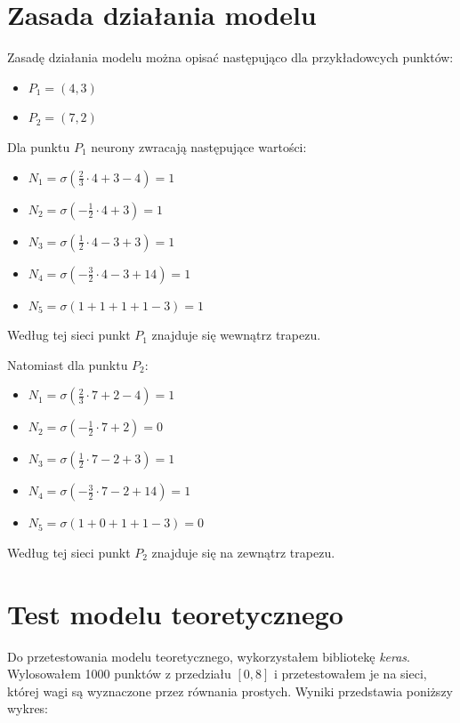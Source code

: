 \documentclass{article}
\begin{document}
\newpage

\section{Zasada działania modelu}

Zasadę działania modelu można opisać następująco dla przykładowcych punktów:

\begin{itemize}
    \centering
    \item $P_1 = (4, 3)$
    \item $P_2 = (7, 2)$
\end{itemize}
Dla punktu $P_1$ neurony zwracają następujące wartości:
\begin{itemize}
    \centering
    \item $N_1 = \sigma(\frac{2}{3}\cdot4 + 3 - 4) = 1$
    \item $N_2 = \sigma(-\frac{1}{2}\cdot4 + 3) = 1$
    \item $N_3 = \sigma(\frac{1}{2}\cdot4 - 3 + 3) = 1$
    \item $N_4 = \sigma(-\frac{3}{2}\cdot4 - 3 + 14) = 1$
    \item $N_5 = \sigma(1 + 1 + 1 + 1 - 3) = 1$
\end{itemize}
Według tej sieci punkt $P_1$ znajduje się wewnątrz trapezu.

Natomiast dla punktu $P_2$:
\begin{itemize}
    \centering
    \item $N_1 = \sigma(\frac{2}{3}\cdot7 + 2 - 4) = 1$
    \item $N_2 = \sigma(-\frac{1}{2}\cdot7 + 2) = 0$
    \item $N_3 = \sigma(\frac{1}{2}\cdot7 - 2 + 3) = 1$
    \item $N_4 = \sigma(-\frac{3}{2}\cdot7 - 2 + 14) = 1$
    \item $N_5 = \sigma(1 + 0 + 1 + 1 - 3) = 0$
\end{itemize}
Według tej sieci punkt $P_2$ znajduje się na zewnątrz trapezu.

\section{Test modelu teoretycznego}

Do przetestowania modelu teoretycznego, wykorzystałem bibliotekę
\textit{keras}. Wylosowałem 1000 punktów z przedziału $[0, 8]$ i
przetestowałem je na sieci, której wagi są wyznaczone przez
równania prostych. Wyniki przedstawia poniższy wykres:
\end{document}

